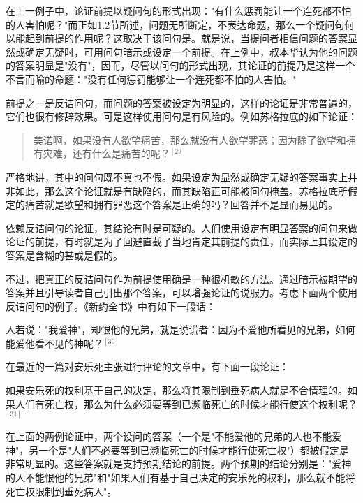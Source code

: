 在上一例子中，论证前提以疑问句的形式出现："有什么惩罚能让一个连死都不怕的人害怕呢？"而正如1.2节所述，问题无所断定，不表达命题，那么一个疑问句何以能起到前提的作用呢？这取决于该问句是。就是说，当提问者相信问题的答案显然或确定无疑时，可用问句暗示或设定一个前提。在上例中，叔本华认为他的问题的答案明显是"没有"，因而，尽管以问句的形式出现，其论证的前提乃是这样一个不言而喻的命题："没有任何惩罚能够让一个连死都不怕的人害怕。"

前提之一是反诘问句，而问题的答案被设定为明显的，这样的论证是非常普遍的，它们也很有修辞效果。可是这样使用问句是有风险的。例如苏格拉底的如下论证：

\begin{quotation}
美诺啊，如果没有人欲望痛苦，那么就没有人欲望罪恶；因为除了欲望和拥有灾难，还有什么是痛苦的呢？${}^{[29]}$
\end{quotation}

严格地讲，其中的问句既不真也不假。如果设定为显然或确定无疑的答案事实上并非如此，那么这个论证就是有缺陷的，而其缺陷正可能被问句掩盖。苏格拉底所假定的痛苦就是欲望和拥有罪恶这个答案是正确的吗？回答并不是显而易见的。

依赖反诘问句的论证，其结论有时是可疑的。人们使用设定有明显答案的问句来做论证的前提，有时就是为了回避直截了当地肯定其前提的责任，而实际上其设定的答案是含糊的甚或是假的。

不过，把真正的反诘问句作为前提使用确是一种很机敏的方法。通过暗示被期望的答案并且引导读者自己引出那个答案，可以增强论证的说服力。考虑下面两个使用反诘问句的例子。《新约全书》中有如下一段话：

\begin{displayquote}
人若说："我爱神"，却恨他的兄弟，就是说谎者：因为不爱他所看见的兄弟，如何能爱他看不见的神呢？${}^{[30]}$
\end{displayquote}

在最近的一篇对安乐死主张进行评论的文章中，有下面一段论证：

\begin{displayquote}
如果安乐死的权利基于自己的决定，那么将其限制到垂死病人就是不合情理的。如果人们有死亡权，那么为什么必须要等到已濒临死亡的时候才能行使这个权利呢？${}^{[31]}$
\end{displayquote}

在上面的两例论证中，两个设问的答案（一个是"不能爱他的兄弟的人也不能爱神"，另一个是"人们不必要等到已濒临死亡的时候才能行使死亡权"）都被假定是非常明显的。这些答案就是支持预期结论的前提。两个预期的结论分别是："爱神的人不能恨他的兄弟"和"如果人们有基于自己决定的安乐死的权利，那么就不能将死亡权限制到垂死病人"。

